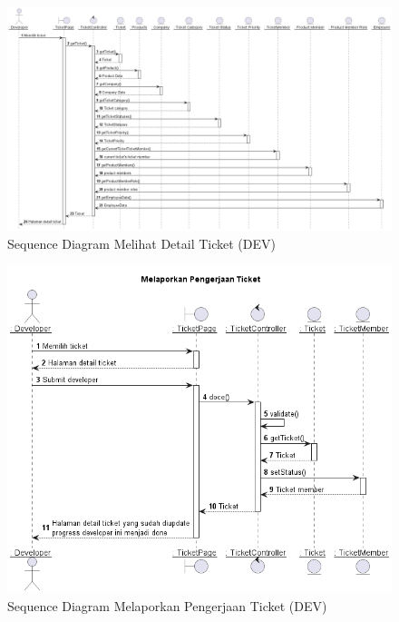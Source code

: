 \documentclass[12pt]{article}
\begin{document}
\begin{enumerate}[label=\textbf{4.\arabic*.}]
\begin{enumerate}[label=\textbf{4.1.\arabic*.}, wide, labelwidth=!, labelindent=0pt]
\begin{enumerate}[label=\textbf{4.1.7.\arabic*.}, wide, labelwidth=!, labelindent=0pt]
\begin{enumerate}[label=\arabic*.]
                \begin{figure}
                    \centering \includegraphics[height=0.575\textheight]{out/plantuml/sequence/idev/idev3/Melihat Detail Ticket.png}
                    \caption{Sequence Diagram Melihat Detail Ticket (DEV)}
                    \label{fig:SQ-DEV-03}
                \end{figure}

                \begin{figure}
                    \centering \includegraphics[height=0.575\textheight]{out/plantuml/sequence/idev/idev4/Melaporkan Pengerjaan Ticket.png}
                    \caption{Sequence Diagram Melaporkan Pengerjaan Ticket (DEV)}
                    \label{fig:SQ-DEV-04}
                \end{figure}
            \end{enumerate}


\end{enumerate}
\end{enumerate}
\end{enumerate}
\end{document}

